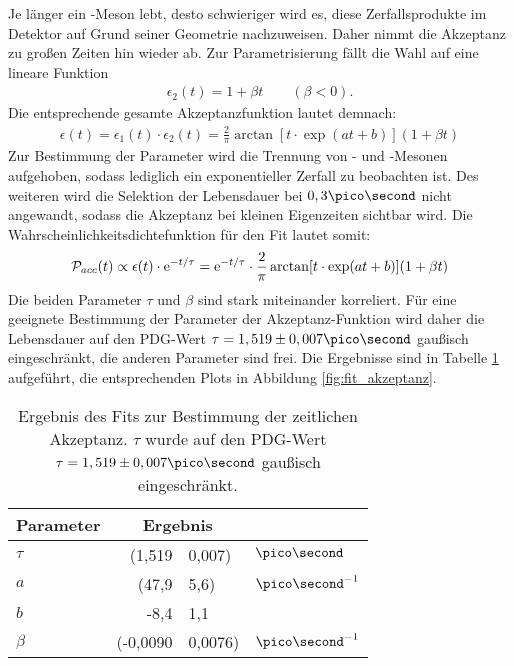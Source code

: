 Je länger ein \Bd-Meson lebt, desto schwieriger wird es, diese Zerfallsprodukte im Detektor auf Grund seiner Geometrie nachzuweisen. Daher nimmt die Akzeptanz zu großen Zeiten hin wieder ab. Zur Parametrisierung fällt die Wahl auf eine lineare Funktion
\begin{align}
\epsilon_2(t) = 1 + \beta t \qquad (\beta < 0).
\end{align}
Die entsprechende gesamte Akzeptanzfunktion lautet demnach:
\begin{align}
\epsilon(t) = \epsilon_1(t) \cdot \epsilon_2(t) = \frac{2}{\pi}\arctan[t\cdot \exp(at+b)](1 + \beta t)
\end{align}
Zur Bestimmung der Parameter wird die Trennung von \Bd- und \Bdbar-Mesonen aufgehoben, sodass lediglich ein exponentieller Zerfall zu beobachten ist. Des weiteren wird die Selektion der Lebensdauer bei $0,3\pico\second$ nicht angewandt, sodass die Akzeptanz bei kleinen Eigenzeiten sichtbar wird. Die Wahrscheinlichkeitsdichtefunktion für den Fit lautet somit:
\begin{align}
\mathcal{P}_{acc}(t) \propto \epsilon(t)\cdot \mathrm{e}^{-t/\tau} = \mathrm{e}^{-t/\tau}\cdot\frac{2}{\pi}\arctan[t\cdot \exp(at+b)](1 + \beta t)
\end{align}
Die beiden Parameter $\tau$ und $\beta$ sind stark miteinander korreliert. Für eine geeignete Bestimmung der Parameter der Akzeptanz-Funktion wird daher die Lebensdauer auf den PDG-Wert $\tau = 1,519 \pm 0,007 \pico\second$ \cite{pdg-tau} gaußisch eingeschränkt, die anderen Parameter sind frei. Die Ergebnisse sind in Tabelle \ref{tab:fit_akzeptanz} aufgeführt, die entsprechenden Plots in Abbildung \ref{fig:fit_akzeptanz}. 

\begin{table}[hptb]
\centering
\caption{Ergebnis des Fits zur Bestimmung der zeitlichen Akzeptanz. $\tau$ wurde auf den PDG-Wert $\tau = 1,519 \pm 0,007 \pico\second$ \cite{pdg-tau} gaußisch eingeschränkt.}
\label{tab:fit_akzeptanz}
\begin{tabular}{lr@{$\pm$}ll}
\hline \hline 
Parameter & \multicolumn{2}{c}{Ergebnis} & \\ \hline
$\tau$    &  (1,519   & 0,007) & $\ps$ \\
$a $       &  (47,9    & 5,6) & $\ps^{-1}$ \\
$b$       &  -8,4    & 1,1 \\
$\beta$   &  (-0,0090 & 0,0076) & $\ps^{-1}$ \\ 
\hline \hline
\end{tabular}
\end{table}

